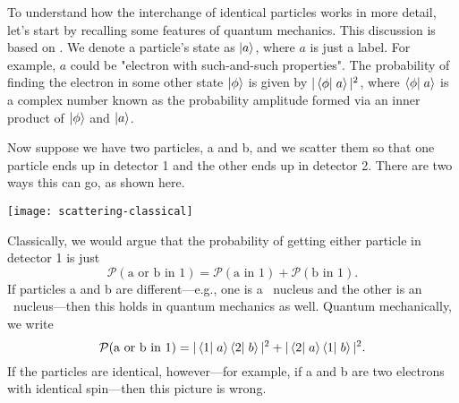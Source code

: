 \begin{sidebar}
\label{sb.identical-particles}
To understand how the interchange of identical particles works in more detail, let's start by recalling some features of quantum mechanics. This discussion is based on  \citet{Feynman1989The-Feynman-Lec}.
We denote a particle's state as $\left|a\right\rangle$, where $a$ is just a label.  For example, $a$ could be "electron with such-and-such properties".  The probability of finding the electron in some other state $\left|\phi\right\rangle$ is given by $|\left\langle\phi\right|\left.a\right\rangle|^2$, where $\left\langle\phi\right|\left.a\right\rangle$ is a complex number known as the probability amplitude formed via an inner product of $\left|\phi\right\rangle$ and $\left|a\right\rangle$.

Now suppose we have two particles, a and b, and we scatter them so that one particle ends up in detector 1 and the other ends up in detector 2. There are two ways this can go, as shown here.
\begin{center}
\texttt{[image: scattering-classical]}
\end{center}
Classically, we would argue that the probability of getting either particle in detector 1 is just
\begin{equation}
    \mathcal{P}(\textrm{a or b in 1}) = \mathcal{P}(\textrm{a in 1}) + \mathcal{P}(\textrm{b in 1}).
\end{equation}
If particles a and b are different---e.g., one is a \carbon\ nucleus and the other is an \oxygen\ nucleus---then this holds in quantum mechanics as well. Quantum mechanically, we write
\begin{equation}\label{e.classical-probability}
    \mathcal{P}(\textrm{a or b in 1}) = |\left\langle1\right|\left.a\right\rangle\left\langle2\right|\left.b\right\rangle|^2 + |\left\langle2\right|\left.a\right\rangle\left\langle1\right|\left.b\right\rangle|^2.
\end{equation}
If the particles are identical, however---for example, if a and b are two electrons with identical spin---then this picture is wrong.


\end{sidebar}
